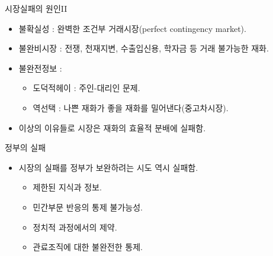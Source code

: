 \documentclass[aspectratio=169,xcolor=dvipsnames,handout]{beamer}
\begin{document}
\begin{frame}{시장실패의 원인II}
    \begin{itemize}
        \item 불확실성 : 완벽한 조건부 거래시장(perfect contingency market).
        \item 불완비시장 : 전쟁, 천재지변, 수출입신용, 학자금 등 거래 불가능한 재화.
        \item 불완전정보 :
        \begin{itemize}
            \item 도덕적헤이 : 주인-대리인 문제.
            \item 역선택 : 나쁜 재화가 좋을 재화를 밀어낸다(중고차시장).
        \end{itemize}
        \item 이상의 이유들로 시장은 재화의 효율적 분배에 실패함.
    \end{itemize}
\end{frame}

\begin{frame}{정부의 실패}
    \begin{itemize}
        \item 시장의 실패를 정부가 보완하려는 시도 역시 실패함.
        \begin{itemize}
            \item 제한된 지식과 정보.
            \item 민간부문 반응의 통제 불가능성.
            \item 정치적 과정에서의 제약.
            \item 관료조직에 대한 불완전한 통제.
        \end{itemize}
    \end{itemize}
\end{frame}

\end{document}
